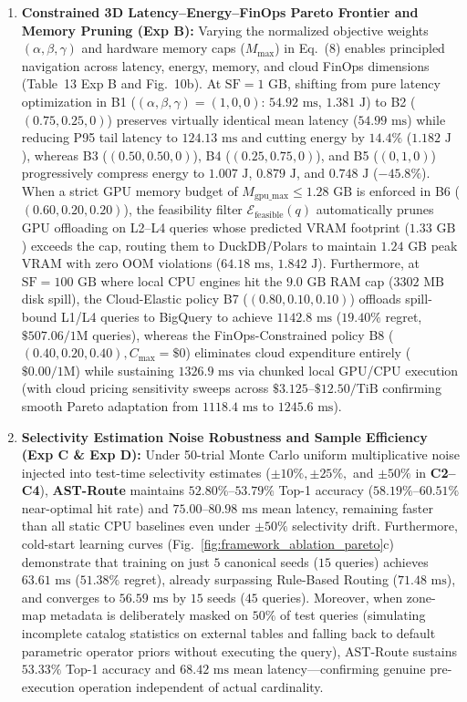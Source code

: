 \documentclass[10pt,a4paper]{article}
\begin{document}
\begin{enumerate}[leftmargin=1.5em,itemsep=2pt]
    \item \textbf{Constrained 3D Latency--Energy--FinOps Pareto Frontier and Memory Pruning (Exp B):} Varying the normalized objective weights $(\alpha, \beta, \gamma)$ and hardware memory caps ($M_{\max}$) in Eq.~(8) enables principled navigation across latency, energy, memory, and cloud FinOps dimensions (Table~13 Exp B and Fig.~10b). At $\text{SF}=1\text{ GB}$, shifting from pure latency optimization in B1 ($(\alpha,\beta,\gamma)=(1,0,0)$: $54.92\text{ ms}$, $1.381\text{ J}$) to B2 ($(0.75, 0.25, 0)$) preserves virtually identical mean latency ($54.99\text{ ms}$) while reducing P95 tail latency to $124.13\text{ ms}$ and cutting energy by $14.4\%$ ($1.182\text{ J}$), whereas B3 ($(0.50, 0.50, 0)$), B4 ($(0.25, 0.75, 0)$), and B5 ($(0, 1, 0)$) progressively compress energy to $1.007\text{ J}$, $0.879\text{ J}$, and $0.748\text{ J}$ ($-45.8\%$). When a strict GPU memory budget of $M_{\text{gpu\_max}} \le 1.28\text{ GB}$ is enforced in B6 ($(0.60, 0.20, 0.20)$), the feasibility filter $\mathcal{E}_{\text{feasible}}(q)$ automatically prunes GPU offloading on L2--L4 queries whose predicted VRAM footprint ($1.33\text{ GB}$) exceeds the cap, routing them to DuckDB/Polars to maintain $1.24\text{ GB}$ peak VRAM with zero OOM violations ($64.18\text{ ms}$, $1.842\text{ J}$). Furthermore, at $\text{SF}=100\text{ GB}$ where local CPU engines hit the $9.0\text{ GB}$ RAM cap ($3302\text{ MB}$ disk spill), the Cloud-Elastic policy B7 ($(0.80, 0.10, 0.10)$) offloads spill-bound L1/L4 queries to BigQuery to achieve $1142.8\text{ ms}$ ($19.40\%$ regret, $\$507.06/1\text{M}$ queries), whereas the FinOps-Constrained policy B8 ($(0.40, 0.20, 0.40), C_{\max}=\$0$) eliminates cloud expenditure entirely ($\$0.00/1\text{M}$) while sustaining $1326.9\text{ ms}$ via chunked local GPU/CPU execution (with cloud pricing sensitivity sweeps across $\$3.125\text{--}\$12.50\text{/TiB}$ confirming smooth Pareto adaptation from $1118.4\text{ ms}$ to $1245.6\text{ ms}$). 
    \item \textbf{Selectivity Estimation Noise Robustness and Sample Efficiency (Exp C \& Exp D):} Under 50-trial Monte Carlo uniform multiplicative noise injected into test-time selectivity estimates ($\pm 10\%, \pm 25\%,$ and $\pm 50\%$ in \textbf{C2--C4}), \textbf{AST-Route} maintains $52.80\%\text{--}53.79\%$ Top-1 accuracy ($58.19\%\text{--}60.51\%$ near-optimal hit rate) and $75.00\text{--}80.98\text{ ms}$ mean latency, remaining faster than all static CPU baselines even under $\pm 50\%$ selectivity drift. Furthermore, cold-start learning curves (Fig.~\ref{fig:framework_ablation_pareto}c) demonstrate that training on just $5$ canonical seeds ($15$ queries) achieves $63.61\text{ ms}$ ($51.38\%$ regret), already surpassing Rule-Based Routing ($71.48\text{ ms}$), and converges to $56.59\text{ ms}$ by $15$ seeds ($45$ queries). Moreover, when zone-map metadata is deliberately masked on $50\%$ of test queries (simulating incomplete catalog statistics on external tables and falling back to default parametric operator priors without executing the query), AST-Route sustains $53.33\%$ Top-1 accuracy and $68.42\text{ ms}$ mean latency---confirming genuine pre-execution operation independent of actual cardinality.

\end{enumerate}
\end{document}
